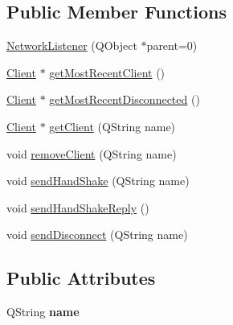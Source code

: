 \subsection*{Public Member Functions}
\begin{DoxyCompactItemize}
\item 
\hyperlink{class_network_listener_ad0b176bc71290ed0d15705ee1ffdcf42}{Network\+Listener} (Q\+Object $\ast$parent=0)
\item 
\hyperlink{struct_client}{Client} $\ast$ \hyperlink{class_network_listener_a3bb629317b41d6b1f99a5b07b42a284f}{get\+Most\+Recent\+Client} ()
\item 
\hyperlink{struct_client}{Client} $\ast$ \hyperlink{class_network_listener_a9439e56b56ded28da4dc9c8584849e95}{get\+Most\+Recent\+Disconnected} ()
\item 
\hyperlink{struct_client}{Client} $\ast$ \hyperlink{class_network_listener_a30a1a0a5b42a426dc86ac131bd11aafd}{get\+Client} (Q\+String name)
\item 
void \hyperlink{class_network_listener_a989f81e745b1725562da7b6fcfadac83}{remove\+Client} (Q\+String name)
\item 
void \hyperlink{class_network_listener_aebdaf064bfc92c215266faa0a07ca61d}{send\+Hand\+Shake} (Q\+String name)
\item 
void \hyperlink{class_network_listener_a4905e63cbcdd10abd1cfdaff31364383}{send\+Hand\+Shake\+Reply} ()
\item 
void \hyperlink{class_network_listener_abd383f47c7878354e182093cd615ab23}{send\+Disconnect} (Q\+String name)
\end{DoxyCompactItemize}
\subsection*{Public Attributes}
\begin{DoxyCompactItemize}
\item 
\hypertarget{class_network_listener_af0f6d8c5a2b1b2c457e1e4ee68e1d4bf}{}Q\+String {\bfseries name}\label{class_network_listener_af0f6d8c5a2b1b2c457e1e4ee68e1d4bf}

\end{DoxyCompactItemize}
